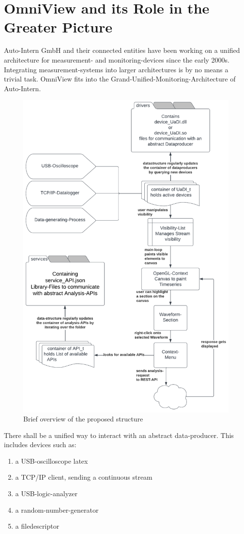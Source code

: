 \documentclass[]{scrreprt}
\begin{document}
\section[Greater Picture]{OmniView and its Role in the Greater Picture}
Auto-Intern GmbH and their connected entities have been working on a unified architecture for measurement- and monitoring-devices since the early 2000s. 
Integrating measurement-systems into larger architectures is by no means a trivial task.
OmniView fits into the Grand-Unified-Monitoring-Architecture of Auto-Intern.


\begin{figure}
    \includegraphics[width=.9\textwidth]{./assets/pictures/overview.pdf}
    \caption[]{Brief overview of the proposed structure}
    \label{fig:overview}
\end{figure}


There shall be a unified way to interact with an abstract data-producer.
This includes devices such as:
\begin{enumerate}
    \item a USB-oscilloscope \gls{latex}
    \item a TCP/IP client, sending a continuous stream
    \item a USB-logic-analyzer
    \item a random-number-generator
    \item a filedescriptor
\end{enumerate}
\end{document}

